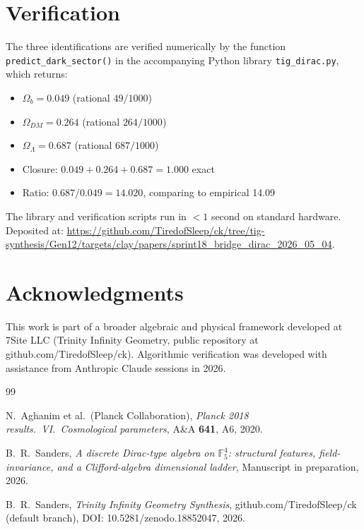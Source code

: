 \documentclass[11pt,reqno]{amsart}
\theoremstyle{plain}
\theoremstyle{definition}
\theoremstyle{remark}
\newcommand{\F}{\mathbb{F}}
\begin{document}
\section{Verification}

The three identifications are verified numerically by the function
\texttt{predict\_dark\_sector()} in the accompanying Python library
\texttt{tig\_dirac.py}, which returns:
\begin{itemize}
\item $\Omega_b = 0.049$ (rational $49/1000$)
\item $\Omega_{DM} = 0.264$ (rational $264/1000$)
\item $\Omega_\Lambda = 0.687$ (rational $687/1000$)
\item Closure: $0.049 + 0.264 + 0.687 = 1.000$ exact
\item Ratio: $0.687 / 0.049 = 14.020$, comparing to empirical 14.09
\end{itemize}
The library and verification scripts run in $<1$ second on standard
hardware. Deposited at:
\url{https://github.com/TiredofSleep/ck/tree/tig-synthesis/Gen12/targets/clay/papers/sprint18_bridge_dirac_2026_05_04}.

\section*{Acknowledgments}

This work is part of a broader algebraic and physical framework
developed at 7Site LLC (Trinity Infinity Geometry, public repository at
github.com/TiredofSleep/ck). Algorithmic verification was developed with
assistance from Anthropic Claude sessions in 2026.

\begin{thebibliography}{99}

 N.~Aghanim et al.\ (Planck Collaboration),
\emph{Planck 2018 results.\ VI.\ Cosmological parameters},
A\&A \textbf{641}, A6, 2020.

 B.~R.~Sanders,
\emph{A discrete Dirac-type algebra on $\F_5^4$: structural features,
field-invariance, and a Clifford-algebra dimensional ladder},
Manuscript in preparation, 2026.

 B.~R.~Sanders,
\emph{Trinity Infinity Geometry Synthesis},
github.com/TiredofSleep/ck (default branch),
DOI: 10.5281/zenodo.18852047, 2026.

\end{thebibliography}
\end{document}
